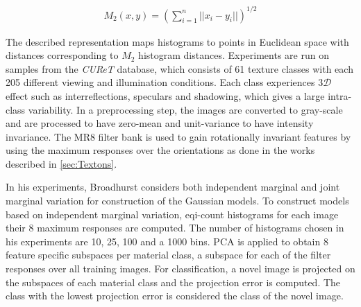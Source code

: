 	\begin{eqnarray*}
		M_2(x, y) = (\sum^n_{i=1} ||x_i - y_i||)^{1/2}
	\end{eqnarray*}

The described representation maps histograms to points in Euclidean space with distances corresponding to $M_2$ histogram distances. Experiments are run on samples from the {\it CUReT} database, which consists of 61 texture classes with each 205 different viewing and illumination conditions. Each class experiences $3\mathcal{D}$ effect such as interreflections, speculars and shadowing, which gives a large intra-class variability. In a preprocessing step, the images are converted to gray-scale and are processed to have zero-mean and unit-variance to have intensity invariance. The MR8 filter bank is used to gain rotationally invariant features by using the maximum responses over the orientations as done in the works described in \ref{sec:Textons}.


In his experiments, Broadhurst considers both independent marginal and joint marginal variation for construction of the Gaussian models. To construct models based on independent marginal variation, eqi-count histograms for each image their 8 maximum responses are computed. The number of histograms chosen in his experiments are 10, 25, 100 and a 1000 bins. PCA is applied to obtain 8 feature specific subspaces per material class, a subspace for each of the filter responses over all training images. For classification, a novel image is projected on the subspaces of each material class and the projection error is computed. The class with the lowest projection error is considered the class of the novel image.


